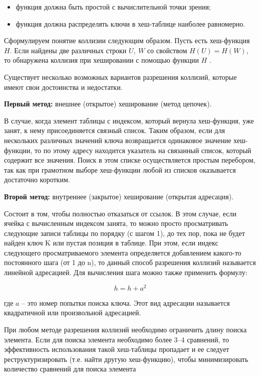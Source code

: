 \begin{itemize}[$\bullet$]
    \item функция должна быть простой с вычислительной точки зрения;
    \item функция должна распределять ключи в хеш-таблице наиболее равномерно.
\end{itemize}

Сформулируем понятие коллизии следующим образом. Пусть есть хеш-функция $H$. Если найдены две различных строки $U,~W$  со свойством $H(U) 
= H(W)$, то обнаружена коллизия при хешировании с помощью функции $H$ \cite{hash}.

Существует  несколько  возможных  вариантов  разрешения  коллизий,  которые имеют свои достоинства и недостатки.

\textbf{Первый метод:} внешнее (открытое) хеширование (метод цепочек). 

В случае, когда элемент таблицы с индексом, который вернула хеш-функция, 
уже  занят,  к  нему  присоединяется  связный  список.  Таким  образом,  если  для 
нескольких  различных  значений  ключа  возвращается  одинаковое  значение  хеш-функции,  то  по  этому  адресу  находится  указатель  на  связанный  список,  который 
содержит все значения. Поиск в этом списке осуществляется простым перебором, так 
как при грамотном выборе хеш-функции любой из списков оказывается достаточно 
коротким.

\textbf{Второй метод:} внутреннее (закрытое) хеширование (открытая адресация).

Состоит в том, чтобы полностью 
отказаться от ссылок. В этом случае, если ячейка с вычисленным индексом занята, то 
можно просто просматривать следующие записи таблицы по порядку (с шагом 1), до 
тех пор, пока не будет найден ключ K или пустая позиция в таблице. При этом, если 
индекс следующего просматриваемого элемента определяется добавлением какого-то 
постоянного  шага  (от  1  до  n),  то  данный  способ  разрешения  коллизий  называется 
линейной адресацией. Для вычисления шага можно также применить формулу:

\begin{equation}
    h = h + a^2
\end{equation}

где  $a$  – это  номер  попытки  поиска  ключа.  Этот  вид  адресации  называется 
квадратичной или произвольной адресацией. 

При любом методе разрешения коллизий необходимо ограничить длину поиска 
элемента.  Если  для  поиска  элемента  необходимо  более  3–4  сравнений,  то 
эффективность  использования  такой  хеш-таблицы  пропадает  и  ее  следует 
реструктуризировать  (т.е.  найти  другую  хеш-функцию),  чтобы  минимизировать 
количество сравнений для поиска элемента  


